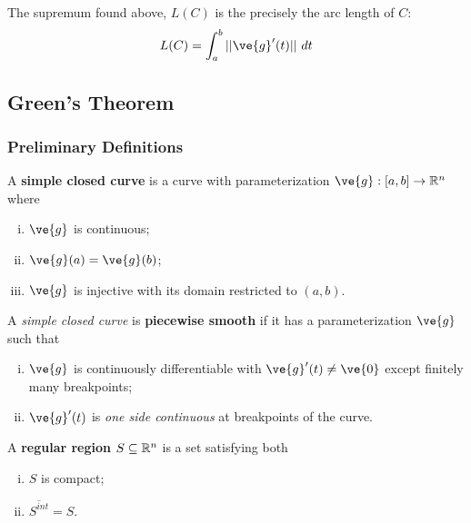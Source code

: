 \documentclass[11pt]{article}
\begin{document}
			\begin{theorem}
				The supremum found above, $L(C)$ is the precisely the arc length of $C$:
				\begin{equation}
					L(C) = \int_a^b ||\ve{g}'(t)||\ dt
				\end{equation}
			\end{theorem}
		
		\subsection{Green's Theorem}
			\subsubsection{Preliminary Definitions}
				\begin{definition}
					A \textbf{simple closed curve} is a curve with parameterization $\ve{g}: [a, b] \to \R^n$ where
					\begin{enumerate}[(i)]
						\item $\ve{g}$ is continuous;
						\item $\ve{g}(a) = \ve{g}(b)$;
						\item $\ve{g}$ is injective with its domain restricted to $(a, b)$.
					\end{enumerate}
				\end{definition}
				
				\begin{definition}
					A \emph{simple closed curve} is \textbf{piecewise smooth} if it has a parameterization $\ve{g}$ such that
					\begin{enumerate}[(i)]
						\item $\ve{g}$ is continuously differentiable with $\ve{g}'(t) \neq \ve{0}$ except finitely many breakpoints;
						\item $\ve{g}'(t)$ is \emph{one side continuous} at breakpoints of the curve.
					\end{enumerate}
				\end{definition}
				
				\begin{definition}
					A \textbf{regular region} $S \subseteq \mathbb{R}^n$ is a set satisfying both
					\begin{enumerate}[(i)]
						\item $S$ is compact;
						\item $\overline{S^{int}} = S$.
					\end{enumerate}
				\end{definition}
				
\end{document}
